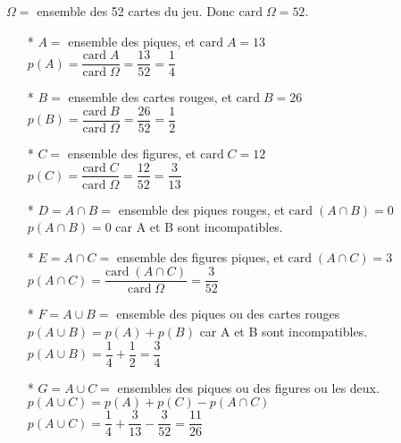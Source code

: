 $\Omega =$ ensemble des 52 cartes du jeu. Donc $\mathrm{card} \; \Omega = 52$. 

\begin{itemize}
\item[*] $A = $ ensemble des piques, et $\mathrm{card} \; A = 13$ \\ $p\left(A\right) = \dfrac{\mathrm{card} \; A}{\mathrm{card} \; \Omega} = \dfrac{13}{52} = \dfrac{1}{4} $ \\

\item[*] $B = $ ensemble des cartes rouges, et $\mathrm{card} \; B = 26$ \\ $p\left(B\right) = \dfrac{\mathrm{card} \; B}{\mathrm{card} \; \Omega} = \dfrac{26}{52} = \dfrac{1}{2} $ \\

\item[*] $C = $ ensemble des figures, et $\mathrm{card} \; C = 12$ \\ $p\left(C\right) = \dfrac{\mathrm{card} \; C}{\mathrm{card} \; \Omega} = \dfrac{12}{52} = \dfrac{3}{13} $ \\

\item[*] $D = A\cap B = $ ensemble des piques rouges, et $\mathrm{card} \; \left(A \cap B\right) = 0$ \\ $p\left(A \cap B\right) = 0$ car A et B sont incompatibles. \\

\item[*] $E = A \cap C = $ ensemble des figures piques, et $\mathrm{card} \; \left(A \cap C\right) = 3$ \\ $p\left(A \cap C \right) = \dfrac{ \mathrm{card} \; \left(A \cap C\right)}{\mathrm{card} \; \Omega} = \dfrac{3}{52} $ \\

\item[*] $F = A \cup B = $ ensemble des piques ou des cartes rouges \\ $p\left(A \cup B\right) = p\left(A\right) + p\left(B\right)$ car A et B sont incompatibles. \\ $p\left(A \cup B\right) = \dfrac{1}{4} + \dfrac{1}{2} = \dfrac{3}{4} $ \\

\item[*]  $G = A \cup C =$ ensembles des piques ou des figures ou les deux. \\ $p\left(A \cup C\right) = p\left(A\right) + p\left(C\right) - p\left(A \cap C\right) $ \\ $p\left(A \cup C\right) = \dfrac{1}{4} + \dfrac{3}{13} - \dfrac{3}{52} = \dfrac{11}{26} $ \\


\end{itemize}

